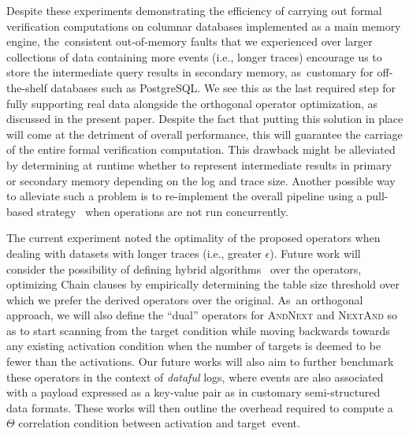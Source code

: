 \documentclass[information,article,accept,pdftex,oneauthor]{Definitions/mdpi}
\begin{document}
Despite these experiments demonstrating the efficiency of carrying out formal verification computations on columnar databases implemented as a main memory engine, the~consistent out-of-memory faults that we experienced over larger collections of data containing more events (i.e., longer traces) encourage us to store the intermediate query results in secondary memory, as~customary for off-the-shelf databases such as PostgreSQL. We see this as the last required step for fully supporting real data alongside the orthogonal operator optimization, as discussed in the present paper. Despite the fact that putting this solution in place will come at the detriment of overall performance, this will guarantee the carriage of the entire formal verification computation. This drawback might be alleviated by determining at runtime whether to represent intermediate results in primary or secondary memory depending on the log and trace size. Another possible way to alleviate such a problem is to re-implement the overall pipeline using a pull-based strategy~\cite{DBLP:books/x/dittrich2016} when operations are not run concurrently.  


The current experiment noted the optimality of the proposed operators when dealing with datasets with longer traces (i.e., greater $\epsilon$). Future work will consider the possibility of defining hybrid algorithms~\cite{4567924} over the operators, optimizing {Chain} clauses  by empirically determining the table size threshold over which we prefer the derived operators over the original. As~an orthogonal approach, we will also define the ``dual'' operators for \textsc{AndNext} and \textsc{NextAnd} so as to start scanning from the target condition while moving backwards towards any existing activation condition when the number of targets is deemed to be fewer than the activations. \deleted{\P} Our future works will also aim to further benchmark these operators in the context of \textit{dataful} logs, where events are also associated with a payload expressed as a key-value pair as in customary semi-structured data formats. These works will then outline the overhead required to compute a $\Theta$ correlation condition between activation and target~event. 
\end{document}
